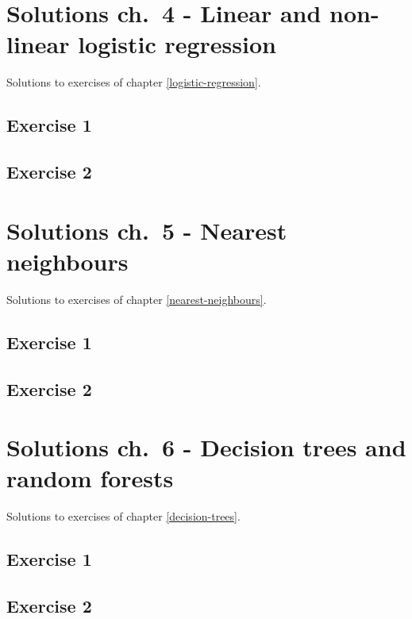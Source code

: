\documentclass[]{book}
\theoremstyle{definition}
\theoremstyle{definition}
\theoremstyle{definition}
\theoremstyle{remark}
\begin{document}
\chapter{Solutions ch.~4 - Linear and non-linear logistic
regression}\label{solutions-logistic-regression}

Solutions to exercises of chapter \ref{logistic-regression}.

\section{Exercise 1}\label{exercise-1-1}

\section{Exercise 2}\label{exercise-2-1}

\chapter{Solutions ch.~5 - Nearest
neighbours}\label{solutions-nearest-neighbours}

Solutions to exercises of chapter \ref{nearest-neighbours}.

\section{Exercise 1}\label{exercise-1-2}

\section{Exercise 2}\label{exercise-2-2}

\chapter{Solutions ch.~6 - Decision trees and random
forests}\label{solutions-decision-trees}

Solutions to exercises of chapter \ref{decision-trees}.

\section{Exercise 1}\label{exercise-1-3}

\section{Exercise 2}\label{exercise-2-3}
\end{document}
